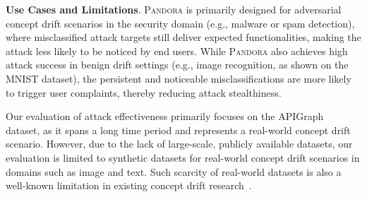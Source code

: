 \documentclass[lettersize,journal]{IEEEtran}
\newcommand{\pandora}{{\scshape Pandora}\xspace}
\begin{document}


\textbf{Use Cases and Limitations}.
\pandora is primarily designed for adversarial concept drift scenarios in the security domain (e.g., malware or spam detection), where misclassified attack targets still deliver expected functionalities, making the attack less likely to be noticed by end users.
While \pandora also achieves high attack success in benign drift settings (e.g., image recognition, as shown on the MNIST dataset), the persistent and noticeable misclassifications are more likely to trigger user complaints, thereby reducing attack stealthiness.

Our evaluation of attack effectiveness primarily focuses on the APIGraph~\cite{2020-CCS-APIGraph} dataset, as it spans a long time period and represents a real-world concept drift scenario.
However, due to the lack of large-scale, publicly available datasets, our evaluation is limited to synthetic datasets for real-world concept drift scenarios in domains such as image and text.
Such scarcity of real-world datasets is also a well-known limitation in existing concept drift research~\cite{ganguly2023online,2023-Usenix-chenyizhen,2021-Usenix-CDAE}.
\end{document}
